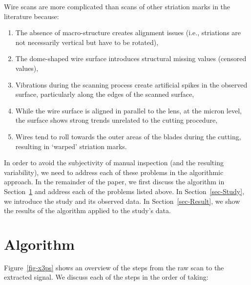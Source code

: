 \documentclass[
  authoryear,
  preprint,
  5p,
  twocolumn]{elsarticle}
\providecommand{\tightlist}{%
  \setlength{\itemsep}{0pt}\setlength{\parskip}{0pt}}\usepackage{longtable,booktabs,array}
\begin{document}
Wire scans are more complicated than scans of other striation marks in
the literature because:

\begin{enumerate}
\def\labelenumi{\arabic{enumi}.}
\tightlist
\item
  The absence of macro-structure creates alignment issues (i.e.,
  striations are not necessarily vertical but have to be rotated),
\item
  The dome-shaped wire surface introduces structural missing values
  (censored values),
\item
  Vibrations during the scanning process create artificial spikes in the
  observed surface, particularly along the edges of the scanned surface,
\item
  While the wire surface is aligned in parallel to the lens, at the
  micron level, the surface shows strong trends unrelated to the cutting
  procedure,
\item
  Wires tend to roll towards the outer areas of the blades during the
  cutting, resulting in `warped' striation marks.
\end{enumerate}

In order to avoid the subjectivity of manual inspection (and the
resulting variability), we need to address each of these problems in the
algorithmic approach. In the remainder of the paper, we first discuss
the algorithm in Section~\ref{sec-Algorithm} and address each of the
problems listed above. In Section~\ref{sec-Study}, we introduce the
study and its observed data. In Section~\ref{sec-Result}, we show the
results of the algorithm applied to the study's data.

\section{Algorithm}\label{sec-Algorithm}

Figure~\ref{fig-x3ps} shows an overview of the steps from the raw scan
to the extracted signal. We discuss each of the steps in the order of
taking:
\end{document}
